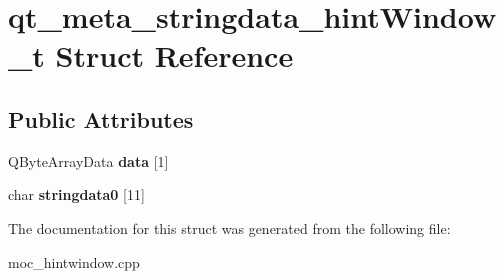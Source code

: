 \hypertarget{structqt__meta__stringdata__hintWindow__t}{}\section{qt\+\_\+meta\+\_\+stringdata\+\_\+hint\+Window\+\_\+t Struct Reference}
\label{structqt__meta__stringdata__hintWindow__t}
\subsection*{Public Attributes}
\begin{DoxyCompactItemize}
\item 
\mbox{\label{structqt__meta__stringdata__hintWindow__t_ab58cc65427bb276ba5d48112ab399679}} 
Q\+Byte\+Array\+Data {\bfseries data} \mbox{[}1\mbox{]}
\item 
\mbox{\label{structqt__meta__stringdata__hintWindow__t_a891687f032c8fd3aac7360a324e294ff}} 
char {\bfseries stringdata0} \mbox{[}11\mbox{]}
\end{DoxyCompactItemize}


The documentation for this struct was generated from the following file\+:\begin{DoxyCompactItemize}
\item 
moc\+\_\+hintwindow.\+cpp\end{DoxyCompactItemize}

